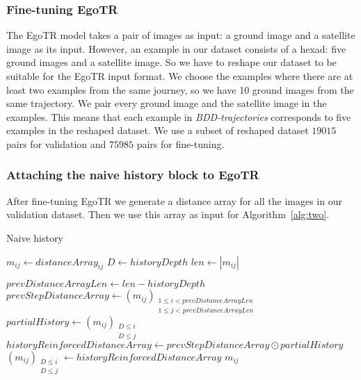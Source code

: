 \documentclass[10pt,letterpaper]{article}
\begin{document}
\subsubsection*{Fine-tuning EgoTR}
The EgoTR model takes a pair of images as input: a ground image and a satellite image as its input. However, an example in our dataset consists of a hexad: five ground images and a satellite image. So we have to reshape our dataset to be suitable for the EgoTR input format. We choose the examples where there are at least two examples from the same journey, so we have 10 ground images from the same trajectory. We pair every ground image and the satellite image in the examples. This means that each example in \emph{BDD-trajectories} corresponds to five examples in the reshaped dataset. We use a subset of reshaped dataset $19015$ pairs for validation and $75985$ pairs for fine-tuning.

\subsubsection*{Attaching the naive history block to EgoTR}
After fine-tuning EgoTR we generate a distance array for all the images in our validation dataset. Then we use this array as input for Algorithm~\ref{alg:two}.

\begin{algorithm}[H]
  \label{algorithm2}
  \caption{Naive history}\label{alg:two}
  $m_{ij} \gets distanceArray_{ij}$\;
  $D \gets historyDepth$\;
  $len \gets |m_{ij}|$\;
  
   {
      $prevDistanceArrayLen \gets len - historyDepth$\;
      $prevStepDistanceArray \gets (m_{ij})_{\substack{1\le i < prevDistanceArrayLen \\ 1\le j < prevDistanceArrayLen }}$\;
      $partialHistory \gets (m_{ij})_{\substack{D \le i \\ D \le j}}$\;
      $historyReinforcedDistanceArray \gets prevStepDistanceArray \odot partialHistory$\;
      $(m_{ij})_{\substack{D \le i \\ D \le j}} \gets historyReinforcedDistanceArray$\;
  }
  \Return $m_{ij}$\;
\end{algorithm}
\end{document}
